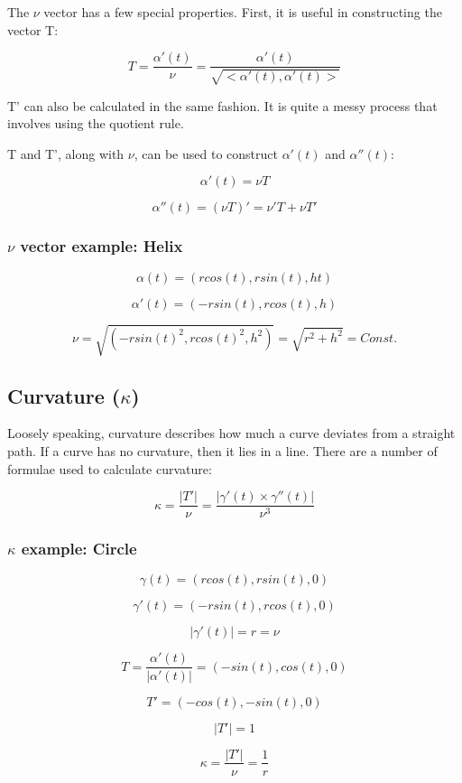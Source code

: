 \documentclass{article}
\begin{document}
 The $\nu$ vector has a few special properties. First, it is useful in constructing the vector T:
 
 \[T = \frac{\alpha'(t)}{\nu} = \frac{\alpha'(t)}{\sqrt{<\alpha'(t), \alpha'(t)>}} \]
 
 T' can also be calculated in the same fashion. It is quite a messy process that involves using the quotient rule. 
 
 T and T', along with $\nu$, can be used to construct $\alpha'(t)$ and $\alpha''(t)$:
 
 \[ \alpha'(t) = \nu T \]
 
 \[ \alpha''(t) = (\nu T)' = \nu'T + \nu T' \]
 
  \subsubsection{$\nu$ vector example: Helix}
 
 \[ \alpha(t) = (rcos(t), rsin(t), ht) \]
 
 \[\alpha'(t) = (-rsin(t), rcos(t), h) \]
 
  \[\nu = \sqrt{(-rsin(t)^2 , rcos(t)^2 , h^2)} = \sqrt{r^2 + h^2} = Const. \]
 
 \subsection{Curvature ($\kappa$)}
 
 Loosely speaking, curvature describes how much a curve deviates from a straight path. If a curve has no curvature, then it lies in a line. There are a number of formulae used to calculate curvature:
 
 \[ \kappa = \frac{|T'|}{\nu} = \frac{|\gamma'(t) \times \gamma''(t)|}{\nu^3}\] 
 
 \subsubsection{$\kappa$ example: Circle}
 
 \[ \gamma(t) = (rcos(t), rsin(t), 0) \]
 
 \[ \gamma'(t) = (-rsin(t), rcos(t), 0) \]
 
 \[|\gamma'(t)| = r = \nu \]
 
 \[ T = \frac{\alpha'(t)}{|\alpha'(t)|} = (-sin(t), cos(t), 0) \]
 
 \[T' = (-cos(t), -sin(t), 0)\]
 
 \[|T'| = 1 \] 
 
 \[\kappa = \frac{|T'|}{\nu} =  \frac{1}{r}\]
 
\end{document}
